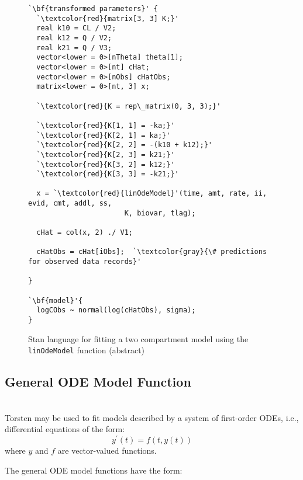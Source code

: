 \documentclass[11pt]{amsart}
\newenvironment{fmpage}[1]
     {\begin{lrbox}{\fmbox}\begin{minipage}{#1}}
     {\end{minipage}\end{lrbox}\fbox{\usebox{\fmbox}}}
\begin{document}
\begin{figure}[!htb]
\caption{Stan language for fitting a two compartment model using the \texttt{linOdeModel} function (abstract)}
\begin{center}
\begin{small}
\begin{fmpage}{\textwidth - .75in}
\begin{lstlisting}[basicstyle=\footnotesize\ttfamily,mathescape=true,flexiblecolumns=true,frame=single,escapeinside=`']
`\bf{transformed parameters}' {
  `\textcolor{red}{matrix[3, 3] K;}'
  real k10 = CL / V2;
  real k12 = Q / V2;
  real k21 = Q / V3;
  vector<lower = 0>[nTheta] theta[1];
  vector<lower = 0>[nt] cHat;
  vector<lower = 0>[nObs] cHatObs;
  matrix<lower = 0>[nt, 3] x;
 
  `\textcolor{red}{K = rep\_matrix(0, 3, 3);}'

  `\textcolor{red}{K[1, 1] = -ka;}'  
  `\textcolor{red}{K[2, 1] = ka;}' 
  `\textcolor{red}{K[2, 2] = -(k10 + k12);}' 
  `\textcolor{red}{K[2, 3] = k21;}' 
  `\textcolor{red}{K[3, 2] = k12;}' 
  `\textcolor{red}{K[3, 3] = -k21;}'

  x = `\textcolor{red}{linOdeModel}'(time, amt, rate, ii, evid, cmt, addl, ss,
                       K, biovar, tlag);

  cHat = col(x, 2) ./ V1;
  
  cHatObs = cHat[iObs];  `\textcolor{gray}{\# predictions for observed data records}'

}

`\bf{model}'{
  logCObs ~ normal(log(cHatObs), sigma);
}
\end{lstlisting}
\end{fmpage}
\end{small}
\end{center}
\label{LinTwoCptCode}
\end{figure}

\subsection{General ODE Model Function} \ \\

Torsten may be used to fit models described by a system of first-order ODEs, i.e., differential equations of the form:
$$ y^\prime\left(t\right) = f\left(t, y\left(t\right)\right) $$
where $y$ and $f$ are vector-valued functions.

The general ODE model functions have the form:
\end{document}
